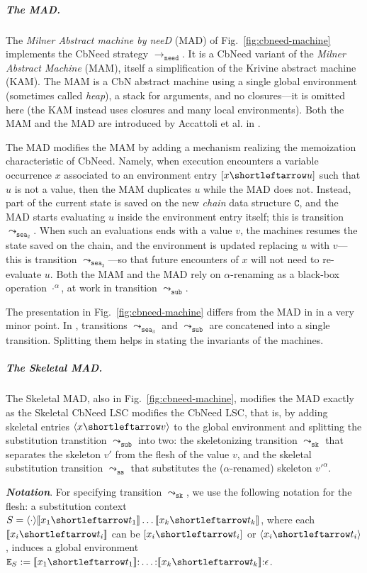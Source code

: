 \documentclass[10pt,a4paper]{article}
\theoremstyle{remark}
\newcommand{\tm}{t}
\newcommand{\tmtwo}{u}
\newcommand{\var}{x}
\newcommand{\Rew}[1]{\rightarrow_{#1}}
\newcommand{\symfont}[1]{\mathtt{#1}}
\newcommand{\sksym}{\symfont{sk}}
\newcommand{\val}{v}
\newcommand{\valtwo}{\val'}
\newcommand{\ctxholep}[1]{\langle #1\rangle}
\newcommand{\ctxhole}{\ctxholep{\cdot}}
\newcommand{\sctx}{S}
\newcommand{\defeq}{:=}
\newcommand{\esub}[2]{[#1{\shortleftarrow}#2]}
\newcommand{\skesub}[2]{\langle#1{\shortleftarrow}#2\rangle}
\newcommand{\reffig}[1]{Fig.~\ref{fig:#1}}
\newcommand{\cbn}{CbN\xspace}
\newcommand{\cbneed}{CbNeed\xspace}
\newcommand{\env}{\genv}
\newcommand{\genv}{\symfont{E}}
\newcommand{\cons}{::}
\newcommand{\renamenop}[1]{#1^\alpha}
\newcommand{\tomachhole}[1]{\leadsto_{#1}}
\newcommand{\subsym}{\symfont{sub}}
\newcommand{\seasym}{\symfont{sea}}
\newcommand{\tomachsub}{\tomachhole{\subsym}}
\newcommand{\tomachseatwo}{\tomachhole{\seasym_2}}
\newcommand{\tomachseathree}{\tomachhole{\seasym_3}}
\newcommand{\emptylist}{\epsilon}
\newcommand{\semsub}[2]{[\![#1{\shortleftarrow}#2]\!]}
\newcommand{\chain}{\symfont{C}}
\newcommand{\tomachsk}{\tomachhole{\sksym}}
\newcommand{\tomachss}{\tomachhole{\sssym}}
\newcommand{\toneed}{\Rew{\symfont{need}}}
\newcommand{\sssym}{\symfont{ss}}
\renewcommand{\cons}{{:}}
\begin{document}
\subparagraph{The MAD.} The \emph{Milner Abstract machine by neeD} (MAD) of \reffig{cbneed-machine} implements the \cbneed strategy $\toneed$. It is a \cbneed variant of the \emph{Milner Abstract Machine} (MAM), itself a simplification of the Krivine abstract machine (KAM). The MAM is a \cbn abstract machine using a single global environment (sometimes called \emph{heap}), a stack for arguments, and no closures---it is omitted here (the KAM instead uses closures and many local environments).  Both the MAM and the MAD are introduced by Accattoli et al. in \cite{DBLP:conf/icfp/AccattoliBM14}.

The MAD modifies the MAM by adding a mechanism realizing the memoization characteristic of \cbneed. Namely, when execution encounters a variable occurrence $\var$ associated to an environment entry $\esub\var\tmtwo$ such that $\tmtwo$ is not a value, then the MAM duplicates $\tmtwo$ while the MAD does not. Instead, part of the current state is saved on the new \emph{chain} data structure $\chain$, and the MAD starts evaluating $\tmtwo$ inside the environment entry itself; this is transition $\tomachseatwo$. When such an evaluations ends with a value $\val$, the machines resumes the state saved on the chain, and the environment is updated replacing $\tmtwo$ with $\val$---this is transition $\tomachseathree$---so that future encounters of $\var$ will not need to re-evaluate $\tmtwo$. Both the MAM and the MAD rely on $\alpha$-renaming as a black-box operation $\renamenop\cdot$, at work in transition $\tomachsub$.


The presentation in \reffig{cbneed-machine} differs from the MAD in \cite{DBLP:conf/icfp/AccattoliBM14} in a very minor point. In \cite{DBLP:conf/icfp/AccattoliBM14}, transitions $\tomachseathree$ and $\tomachsub$ are concatened into a single transition. Splitting them helps in stating the invariants of the machines.

\subparagraph{The Skeletal MAD.} The Skeletal MAD, also in \reffig{cbneed-machine}, modifies the MAD exactly as the Skeletal \cbneed LSC modifies the \cbneed LSC, that is, by adding skeletal entries $\skesub\var\val$ to the global environment and splitting the substitution transtition $\tomachsub$ into two: the skeletonizing transition $\tomachsk$ that separates the skeleton $\valtwo$ from the flesh of the value $\val$, and the skeletal substitution transition $\tomachss$ that substitutes the ($\alpha$-renamed) skeleton $\renamenop\valtwo$. 

\textit{\textbf{Notation}}. For specifying transition $\tomachsk$, we use the following notation for the flesh: a substitution context $\sctx=\ctxhole\semsub{\var_1}{\tm_1}\ldots\semsub{\var_k}{\tm_k}$, where each $\semsub{\var_i}{\tm_i}$ can be $\esub{\var_i}{\tm_i}$ or $\skesub{\var_i}{\tm_i}$, induces a global environment $\env_\sctx \defeq \semsub{\var_1}{\tm_1}\cons\ldots\cons\semsub{\var_k}{\tm_k}\cons\emptylist$.
\end{document}
